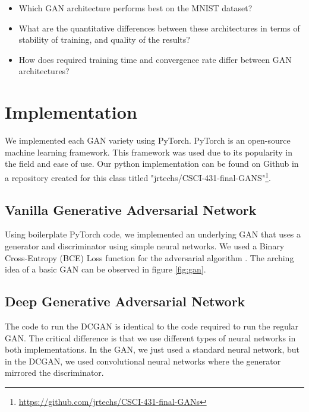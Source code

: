 \documentclass[12pt,
 reprint,
nofootinbib,
 amsmath,amssymb,
 aps,
floatfix,
]{revtex4-2}
\begin{document}
\begin{itemize}
    \item Which GAN architecture performs best on the MNIST dataset?
    \item What are the quantitative differences between these architectures in terms of stability of training, and quality of the results? 
    \item How does required training time and convergence rate differ between GAN architectures?
\end{itemize}


\section{\label{sec:implementation}Implementation}


We implemented each GAN variety using PyTorch. PyTorch is an open-source machine learning framework. This framework was used due to its popularity in the field and ease of use\cite{pytorch}. Our python implementation can be found on Github in a repository created for this class titled "jrtechs/CSCI-431-final-GANS"\footnote{\url{https://github.com/jrtechs/CSCI-431-final-GANs}}.


\subsection{\label{sec:impVanilla}Vanilla Generative Adversarial Network}

Using boilerplate PyTorch code, we implemented an underlying GAN that uses a generator and discriminator using simple neural networks. We used a Binary Cross-Entropy (BCE) Loss function for the adversarial algorithm \cite{generalDeepLearning}. 
The arching idea of a basic GAN can be observed in figure \ref{fig:gan}.


\subsection{\label{sec:impDCGAN}Deep Generative Adversarial Network}


The code to run the DCGAN is identical to the code required to run the regular GAN. The critical difference is that we use different types of neural networks in both implementations. In the GAN, we just used a standard neural network, but in the DCGAN, we used convolutional neural networks where the generator mirrored the discriminator.
\end{document}
